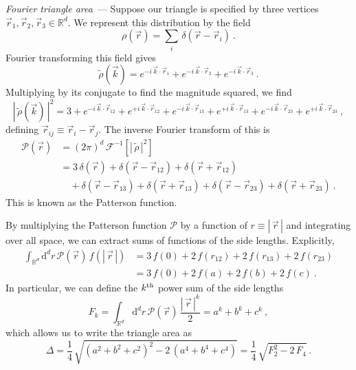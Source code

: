 \documentclass[10pt]{article}
\renewcommand{\paragraph}[1]{\par\addvspace{1.5ex}\noindent\textsl{#1}~---}
\renewcommand{\d}{\mathrm{d}}
\newcommand{\abs}[1]{|\,{#1}\,|}
\begin{document}
\paragraph{Fourier triangle area}
Suppose our triangle is specified by three vertices $\vec{r}_1,\vec{r}_2,\vec{r}_3 \in \mathbb{R}^d$. We represent this distribution by the field
\begin{equation}
    \rho(\vec{r})
    = \sum_i \, \delta(\vec{r} - \vec{r}_i)~.
\end{equation}
Fourier transforming this field gives
\begin{equation}
    \tilde{\rho}(\vec{k})
    =
    e^{-i \, \vec{k} \cdot \vec{r}_1} +
    e^{-i \, \vec{k} \cdot \vec{r}_2} +
    e^{-i \, \vec{k} \cdot \vec{r}_3}~.
\end{equation}
Multiplying by its conjugate to find the magnitude squared, we find
\begin{equation}
    \abs{\tilde{\rho}(\vec{k})}^2
    =
    3 +
    e^{-i \, \vec{k} \cdot \vec{r}_{12}} +
    e^{+i \, \vec{k} \cdot \vec{r}_{12}} +
    e^{-i \, \vec{k} \cdot \vec{r}_{13}} +
    e^{+i \, \vec{k} \cdot \vec{r}_{13}} +
    e^{-i \, \vec{k} \cdot \vec{r}_{23}} +
    e^{+i \, \vec{k} \cdot \vec{r}_{23}}~,
\end{equation}
defining $\vec{r}_{ij} \equiv \vec{r}_i - \vec{r}_j$.
The inverse Fourier transform of this is
\begin{align}
    \mathcal{P}(\vec{r})
    &= (2\pi)^d \, \mathcal{F}^{-1} \left[ \abs{\tilde{\rho}}^2 \right]
    \nonumber\\ 
    &= 3 \,\delta(\vec{r})
    + \delta(\vec{r} - \vec{r}_{12})
    + \delta(\vec{r} + \vec{r}_{12})
    \nonumber\\
    &\quad + \delta(\vec{r} - \vec{r}_{13})
    + \delta(\vec{r} + \vec{r}_{13})
    + \delta(\vec{r} - \vec{r}_{23})
    + \delta(\vec{r} + \vec{r}_{23})~.
\end{align}
This is known as the Patterson function.

By multiplying the Patterson function $\mathcal{P}$ by a function of $r \equiv \abs{\vec{r}}$ and integrating over all space, we can extract sums of functions of the side lengths. Explicitly,
\begin{align}
    \int_{\mathbb{R}^d} \d^d r \, \mathcal{P}(\vec{r}) \, f(\abs{\vec{r}})
    &= 3 \, f(0) +
        2 \, f(r_{12}) +
        2 \, f(r_{13}) +
        2 \, f(r_{23}) \nonumber\\
    &= 3 \, f(0) +
        2 \, f(a) +
        2 \, f(b) +
        2 \, f(c)~.
\end{align}
In particular, we can define the $k^{\rm th}$ power sum of the side lengths
\begin{equation}
    F_k
    = \int_{\mathbb{R}^d} \d^d r \, \mathcal{P}(\vec{r}) \, \frac{\abs{\vec{r}}^k}{2}
    = a^k + b^k + c^k~,
\end{equation}
which allows us to write the triangle area as
\begin{equation}
    \Delta
    = \frac{1}{4} \, \sqrt{\left(a^2+b^2+c^2\right)^2 - 2\, \left(a^4+b^4+c^4\right)}
    = \frac{1}{4} \, \sqrt{F_2^2 - 2\, F_4}~.
\end{equation}
\end{document}
